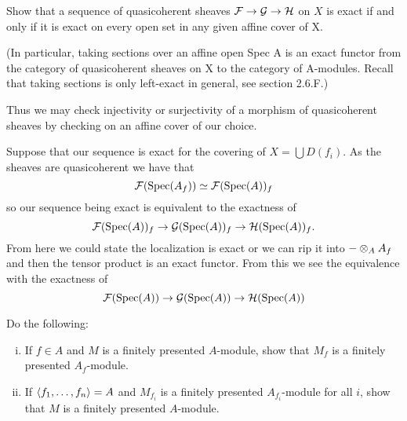\documentclass[12pt]{memoir}
\begin{document}
\begin{Ej}[6.3.A Vakil]
    Show that a sequence of quasicoherent sheaves $\mathcal{F}\to\mathcal{G}\to\mathcal{H}$
    on $X$ is exact if and only if it is exact on every open set in any given affine cover of X.\par 
    (In particular, taking sections over an affine open Spec A is an exact functor from the category of quasicoherent sheaves on X to the category of A-modules. Recall that taking sections is only left-exact in general, see section 2.6.F.)\par
    Thus we may check injectivity or surjectivity of a morphism of quasicoherent sheaves by checking on an affine cover of our choice.
\end{Ej}

\begin{ptcbr}
    Suppose that our sequence is exact for the covering of $X=\bigcup D(f_i)$. As the sheaves are quasicoherent we have that 
    $$\mathcal{F}(\operatorname{Spec}(A_f))\simeq\mathcal{F}(\operatorname{Spec}(A))_f$$
    so our sequence being exact is equivalent to the exactness of 
    $$\mathcal{F}(\operatorname{Spec}(A))_f\to\mathcal{G}(\operatorname{Spec}(A))_f\to\mathcal{H}(\operatorname{Spec}(A))_f.$$
    From here we could state the localization is exact or we can rip it into $-\otimes_AA_f$ and then the tensor product is an exact functor. From this we see the equivalence with the exactness of 
    $$\mathcal{F}(\operatorname{Spec}(A))\to\mathcal{G}(\operatorname{Spec}(A))\to\mathcal{H}(\operatorname{Spec}(A))$$ 
\end{ptcbr}

\begin{Ej}[6.4.B Vakil]
    Do the following:
    \begin{enumerate}[i)]
        \itemsep=-0.4em
        \item If $f\in A$ and $M$ is a finitely presented $A$-module, show that $M_f$ is a finitely presented $A_f$-module.
        \item If $\left\langle f_1,\dots,f_n\right\rangle=A$ and $M_{f_i}$ is a finitely presented $A_{f_i}$-module for all $i$, show that $M$ is a finitely presented $A$-module. 
    \end{enumerate}
\end{Ej}
\end{document}
